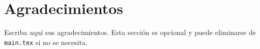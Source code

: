 \chapter*{Agradecimientos}

Escriba aquí sus agradecimientos. Esta sección es opcional y puede eliminarse
de \texttt{main.tex} si no se necesita.
